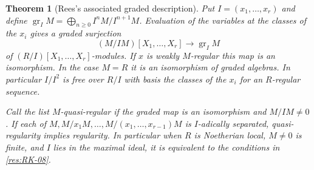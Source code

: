 \documentclass[11pt,oneside,openany]{book}
\newtheorem{theorem}{Theorem}[chapter]
\theoremstyle{definition}
\theoremstyle{remark}
\begin{document}
\begin{theorem}[Rees's associated graded description]\label{res:RK-11}
Put $I=(x_1,\ldots,x_r)$ and define
$\operatorname{gr}_I M=\bigoplus_{n\ge0} I^nM/I^{n+1}M$.
Evaluation of the variables at the classes of the $x_i$ gives
a graded surjection
\[
 (M/IM)[X_1,\ldots,X_r]\longrightarrow\operatorname{gr}_I M
\]
of $(R/I)[X_1,\ldots,X_r]$-modules. If $x$ is weakly $M$-regular
this map is an isomorphism. In the case $M=R$ it is an isomorphism
of graded algebras. In particular $I/I^2$ is free over $R/I$ with
basis the classes of the $x_i$ for an $R$-regular sequence.

Call the list \emph{$M$-quasi-regular} if the graded map is an
isomorphism and $M/IM\ne0$. If each of
$M,M/x_1M,\ldots,M/(x_1,\ldots,x_{r-1})M$ is $I$-adically
separated, quasi-regularity implies regularity. In particular
when $R$ is Noetherian local, $M\ne0$ is finite, and $I$ lies
in the maximal ideal, it is equivalent to the conditions in
\ref{res:RK-08}.
\end{theorem}
\end{document}
